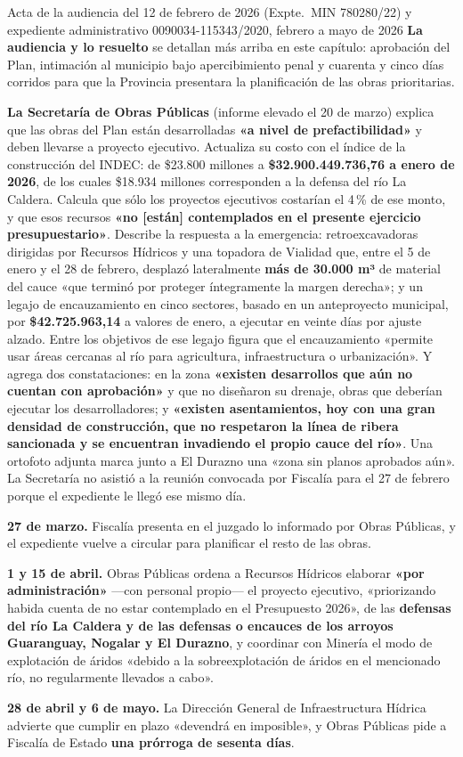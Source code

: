 \begin{ficha}{Acta de la audiencia del 12 de febrero de 2026 (Expte.\ MIN 780280/22) y expediente administrativo 0090034-115343/2020, febrero a mayo de 2026}
\textbf{La audiencia y lo resuelto} se detallan más arriba en este capítulo: aprobación del Plan, intimación al municipio bajo apercibimiento penal y cuarenta y cinco días corridos para que la Provincia presentara la planificación de las obras prioritarias.

\textbf{La Secretaría de Obras Públicas} (informe elevado el 20 de marzo) explica que las obras del Plan están desarrolladas \textbf{«a nivel de prefactibilidad»} y deben llevarse a proyecto ejecutivo. Actualiza su costo con el índice de la construcción del INDEC: de \$23.800 millones a \textbf{\$32.900.449.736,76 a enero de 2026}, de los cuales \$18.934 millones corresponden a la defensa del río La Caldera. Calcula que sólo los proyectos ejecutivos costarían el 4\,\% de ese monto, y que esos recursos \textbf{«no [están] contemplados en el presente ejercicio presupuestario»}. Describe la respuesta a la emergencia: retroexcavadoras dirigidas por Recursos Hídricos y una topadora de Vialidad que, entre el 5 de enero y el 28 de febrero, desplazó lateralmente \textbf{más de 30.000 m³} de material del cauce «que terminó por proteger íntegramente la margen derecha»; y un legajo de encauzamiento en cinco sectores, basado en un anteproyecto municipal, por \textbf{\$42.725.963,14} a valores de enero, a ejecutar en veinte días por ajuste alzado. Entre los objetivos de ese legajo figura que el encauzamiento «permite usar áreas cercanas al río para agricultura, infraestructura o urbanización». Y agrega dos constataciones: en la zona \textbf{«existen desarrollos que aún no cuentan con aprobación»} y que no diseñaron su drenaje, obras que deberían ejecutar los desarrolladores; y \textbf{«existen asentamientos, hoy con una gran densidad de construcción, que no respetaron la línea de ribera sancionada y se encuentran invadiendo el propio cauce del río»}. Una ortofoto adjunta marca junto a El Durazno una «zona sin planos aprobados aún». La Secretaría no asistió a la reunión convocada por Fiscalía para el 27 de febrero porque el expediente le llegó ese mismo día.

\textbf{27 de marzo.} Fiscalía presenta en el juzgado lo informado por Obras Públicas, y el expediente vuelve a circular para planificar el resto de las obras.

\textbf{1 y 15 de abril.} Obras Públicas ordena a Recursos Hídricos elaborar \textbf{«por administración»} ---con personal propio--- el proyecto ejecutivo, «priorizando habida cuenta de no estar contemplado en el Presupuesto 2026», de las \textbf{defensas del río La Caldera y de las defensas o encauces de los arroyos Guaranguay, Nogalar y El Durazno}, y coordinar con Minería el modo de explotación de áridos «debido a la sobreexplotación de áridos en el mencionado río, no regularmente llevados a cabo».

\textbf{28 de abril y 6 de mayo.} La Dirección General de Infraestructura Hídrica advierte que cumplir en plazo «devendrá en imposible», y Obras Públicas pide a Fiscalía de Estado \textbf{una prórroga de sesenta días}.
\end{ficha}

